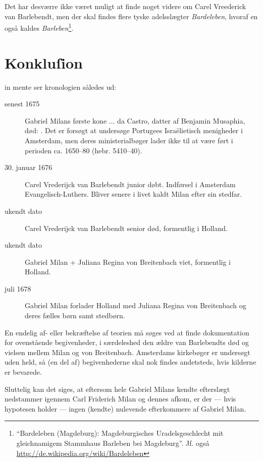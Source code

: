 \documentclass[
	a4paper,
	12pt,
	final
]{memoir}
\begin{document}
Det har desværre ikke været muligt at finde noget videre om Carel Vreederick van Barlebendt, men der skal findes flere tyske adelsslægter \emph{Bardeleben}, hvoraf en også kaldes \emph{Barleben}\footnote{\enquote{Bardeleben (Magdeburg): Magdeburgisches Uradelsgeschlecht mit gleichnamigem Stammhaus Barleben bei Magdeburg}. Jf. også  \url{http://de.wikipedia.org/wiki/Bardeleben}}.

\section{Konkluſion}

 in mente ser kronologien således ud:

\begin{description}
\item[senest 1675] Gabriel Milans første kone ... da Castro, datter af Benjamin Musaphia, død: . Det er forsøgt at undersøge Portugees Israëlietisch menigheder i Amsterdam, men deres ministerialbøger lader ikke til at være ført i perioden ca. 1650--80 (hebr. 5410--40).
\item[30. januar 1676] Carel Vrederijck van Barlebendt junior døbt. Indførsel i Amsterdam Evangelisch-Luthers. Bliver senere i livet kaldt Milan efter sin stedfar.
\item[ukendt dato] Carel Vrederijck van Barlebendt senior død, formentlig i Holland.
\item[ukendt dato] Gabriel Milan + Juliana Regina von Breitenbach viet, formentlig i Holland.
\item[juli 1678] Gabriel Milan forlader Holland med Juliana Regina von Breitenbach og deres fælles børn samt stedbørn.
\end{description}

En endelig af- eller bekræftelse af teorien må søges ved at finde dokumentation for ovenstående begivenheder, i særdeleshed den ældre van Barlebendts død og vielsen mellem Milan og von Breitenbach. Amsterdams kirkebøger er undersøgt uden held, så (en del af) begivenhederne skal nok findes andetsteds, hvis kilderne er bevarede.

Sluttelig kan det siges, at eftersom hele Gabriel Milans kendte efterslægt nedstammer igennem Carl Friderich Milan og dennes afkom, er der --- hvis hypotesen holder --- ingen (kendte) nulevende efterkommere af Gabriel Milan.

%
\end{document}
